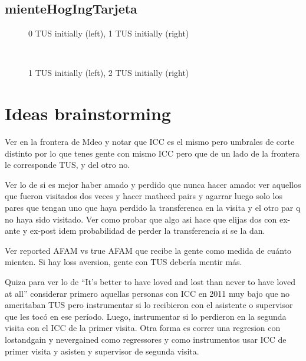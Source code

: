 \documentclass[12pt]{article}
\begin{document}
\subsection{mienteHogIngTarjeta}
\begin{figure}[H]%
	\centering
	\caption*{0 TUS initially (left), 1 TUS initially (right)}
	 \quad 
	 \\
	
	\caption*{1 TUS initially (left), 2 TUS initially (right)}
	 \qquad
	\label{fig:mienteHogIngTarjetaTwo}%
\end{figure}

\section{Ideas brainstorming}
Ver en la frontera de Mdeo y notar que ICC es el mismo pero umbrales de corte distinto por lo que tenes gente con mismo ICC pero que de un lado de la frontera le corresponde TUS, y del otro no.

Ver lo de si es mejor haber amado y perdido que nunca hacer amado: ver aquellos que fueron visitados dos veces y hacer mathced pairs y agarrar luego solo los pares que tengan uno que haya perdido la transferenca en la visita y el otro par q no haya sido visitado. Ver como probar que algo asi hace que elijas dos con ex-ante y ex-post idem probabilidad de perder la transferencia si se la dan.

Ver reported AFAM vs true AFAM que recibe la gente como medida de cuánto mienten. Si hay loss aversion, gente con TUS debería mentir más.

Quiza para ver lo de ``It's better to have loved and lost than never to have loved at all'' considerar primero aquellas personas con ICC en 2011 muy bajo que no ameritaban TUS pero instrumentar si lo recibieron con el asistente o supervisor que les tocó en ese período. Luego, instrumentar si lo perdieron en la segunda visita con el ICC de la primer visita. Otra forma es correr una regresion con lostandgain y nevergained como regressores y como instrumentos usar ICC de primer visita y asisten y supervisor de segunda visita.



\end{document}
